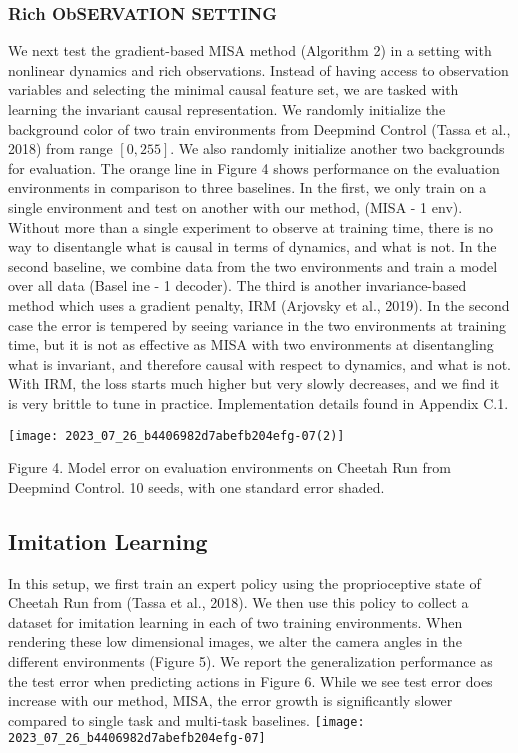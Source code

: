 \documentclass[10pt]{article}
\begin{document}
\subsubsection{Rich ObSERVATION SETTING}
We next test the gradient-based MISA method (Algorithm 2) in a setting with nonlinear dynamics and rich observations. Instead of having access to observation variables and selecting the minimal causal feature set, we are tasked with learning the invariant causal representation. We randomly initialize the background color of two train environments from Deepmind Control (Tassa et al., 2018) from range $[0,255]$. We also randomly initialize another two backgrounds for evaluation. The orange line in Figure 4 shows performance on the evaluation environments in comparison to three baselines. In the first, we only train on a single environment and test on another with our method, (MISA - 1 env). Without more than a single experiment to observe at training time, there is no way to disentangle what is causal in terms of dynamics, and what is not. In the second baseline, we combine data from the two environments and train a model over all data (Basel ine - 1 decoder). The third is another invariance-based method which uses a gradient penalty, IRM (Arjovsky et al., 2019). In the second case the error is tempered by seeing variance in the two environments at training time, but it is not as effective as MISA with two environments at disentangling what is invariant, and therefore causal with respect to dynamics, and what is not. With IRM, the loss starts much higher but very slowly decreases, and we find it is very brittle to tune in practice. Implementation details found in Appendix C.1.

\begin{center}
\texttt{[image: 2023\_07\_26\_b4406982d7abefb204efg-07(2)]}
\end{center}

Figure 4. Model error on evaluation environments on Cheetah Run from Deepmind Control. 10 seeds, with one standard error shaded.

\subsection{Imitation Learning}
In this setup, we first train an expert policy using the proprioceptive state of Cheetah Run from (Tassa et al., 2018). We then use this policy to collect a dataset for imitation learning in each of two training environments. When rendering these low dimensional images, we alter the camera angles in the different environments (Figure 5). We report the generalization performance as the test error when predicting actions in Figure 6. While we see test error does increase with our method, MISA, the error growth is significantly slower compared to single task and multi-task baselines.
\texttt{[image: 2023\_07\_26\_b4406982d7abefb204efg-07]}
\end{document}
